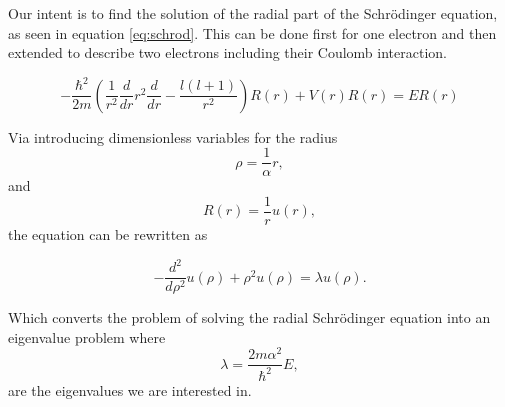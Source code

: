 Our intent is to find the solution of the radial part of the
Schrödinger equation, as seen in equation \ref{eq:schrod}.  This
can be done first for one electron and then extended to describe
two electrons including their Coulomb interaction.

\begin{equation}
    -\frac{\hbar^2}{2m}\left(
    \frac{1}{r^2}\frac{d}{dr}r^2\frac{d}{dr} -
    \frac{l(l+1)}{r^2} \right)R(r) + V(r)R(r) = ER(r)
    \label{eq:schrod}
\end{equation}

Via introducing dimensionless variables for the radius \[\rho =
\frac{1}{\alpha}r,\] and \[R(r) = \frac{1}{r}u(r),\] the equation
can be rewritten as

\begin{equation}
    -\frac{d^2}{d\rho^2}u(\rho) + \rho^2u(\rho) = \lambda
    u(\rho).
    \label{eq:dimensionless_schrod}
\end{equation}

Which converts the problem of solving the radial Schrödinger
equation into an eigenvalue problem where \[\lambda =
\frac{2m\alpha^2}{\hbar^2}E,\] are the eigenvalues we are
interested in.
